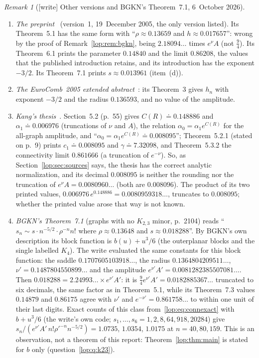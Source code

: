 \documentclass[11pt,letterpaper]{article}
\numberwithin{equation}{section}
\theoremstyle{remark}\newtheorem{remark}[theorem]{Remark}
\begin{document}
\begin{remark}[{[write]} Other versions and BGKN's Theorem~7.1, 6~October 2026]\label{lop:rem:versions}
\begin{enumerate}[label=(\alph*)]\raggedright
\item \emph{The preprint}~\cite{bgknpreprint} (version~1, 19~December 2005,
 the only version listed). Its Theorem~5.1 has the same form with
 ``$\rho\approx0.13659$ and $h\approx0.017657$'': wrong by the proof of
 Remark~\ref{lop:rem:bgkn}, being $2.18094\ldots$ times $e^\nu A$ (not
 $\tfrac94$). Its Theorem~6.1 prints the parameter $0.14840$ and the limit
 $0.86208$, the values that the published introduction retains, and its
 introduction has the exponent $-3/2$. Its Theorem~7.1 prints
 $s\approx0.013961$ (item~(d)).
\item \emph{The EuroComb~2005 extended abstract}~\cite{eurocomb}: its
 Theorem~3 gives $h_n$ with exponent $-3/2$ and the radius $0.136593$, and
 no value of the amplitude.
\item \emph{Kang's thesis}~\cite{kang}. Section~5.2 (p.~55) gives
 $C(R)\doteq0.148886$ and $\alpha_1\doteq0.006976$ (truncations of $\nu$ and
 $A$), the relation $\alpha_0=\alpha_1e^{C(R)}$ for the all-graph amplitude,
 and ``$\alpha_0=\alpha_1e^{C(R)}\doteq0.008095$''; Theorem~5.2.1 (stated on
 p.~9) prints $c_1\doteq0.008095$ and $\gamma\doteq7.32098$, and
 Theorem~5.3.2 the connectivity limit $0.861666$ (a truncation of
 $e^{-\nu}$). So, as Section~\ref{lop:sec:sources} says, the thesis has the
 correct analytic normalization, and its decimal $0.008095$ is neither the
 rounding nor the truncation of $e^\nu A=0.0080960\ldots$ (both are
 $0.008096$). The product of its two printed values,
 $0.006976\,e^{0.148886}=0.0080959318\ldots$, truncates to $0.008095$;
 whether the printed value arose that way is not known.
\item \emph{BGKN's Theorem~7.1} (graphs with no $K_{2,3}$ minor, p.~2104)
 reads ``$s_n\sim s\cdot n^{-5/2}\cdot\rho^{-n}n!$ where $\rho\approx0.13648$
 and $s\approx0.018288$''. By BGKN's own description its block function is
 $b(u)+u^3/6$ (the outerplanar blocks and the single labelled $K_4$). The
 write evaluated the same constants for this block function: the saddle
 $0.1707605103918\ldots$, the radius $0.1364804209511\ldots$,
 $\nu'=0.1487804550899\ldots$ and the amplitude
 $e^{\nu'}A'=0.0081282385507081\ldots$. Then $0.018288=2.24993\ldots\times
 e^{\nu'}A'$: it is $\tfrac94e^{\nu'}A'=0.0182885367\ldots$ truncated to six
 decimals, the same factor as in Theorem~5.1, while its Theorem~7.3 values
 $0.14879$ and $0.86175$ agree with $\nu'$ and $e^{-\nu'}=0.861758\ldots$ to
 within one unit of their last digits.
 Exact counts of this class from~\eqref{lop:eq:connexact} with $b+u^3/6$
 (the write's own code; $s_1,\dots,s_6=1,2,8,64,918,20284$) give
 $s_n/(e^{\nu'}A'\,n!\rho'^{-n}n^{-5/2})=1.0735$, $1.0354$, $1.0175$ at
 $n=40,80,159$. This is an observation, not a theorem of this report:
 Theorem~\ref{lop:thm:main} is stated for $b$ only (question~\ref{lop:q:k23}).
\end{enumerate}
\end{remark}
\end{document}
